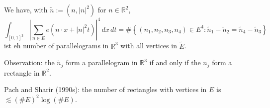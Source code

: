 \documentclass[reqno]{amsart} 
\numberwithin{theorem}{section}
\numberwithin{equation}{section}
\begin{document}
We have, with $\tilde{n} :=(n, \lvert n \rvert^2)$ for $n \in \mathbb{R}^2$,
\begin{equation*}
  \int_{[0, 1]^3}
  \left\lvert \sum_{n \in E} e(n \cdot x + \lvert n \rvert^2 t) \right\rvert^4 \, d x \, d t
  = \# \left\{(n_1, n_2, n_3, n_4) \in E^4 : \tilde{n}_1 - \tilde{n}_2 = \tilde{n}_4 - \tilde{n}_3 \right\}
\end{equation*}
ist eh number of parallelograms in $\mathbb{R}^3$ with all vertices in $\tilde{E}$.

Observation: the $\tilde{n}_j$ form a parallelogram in $\mathbb{R}^3$ if and only if the $n_j$ form a rectangle in $\mathbb{R}^2$.

Pach and Sharir (1990s): the number of rectangles with vertices in $E$ is $\lesssim(\# E)^2 \log(\# E)$.
\end{document}
